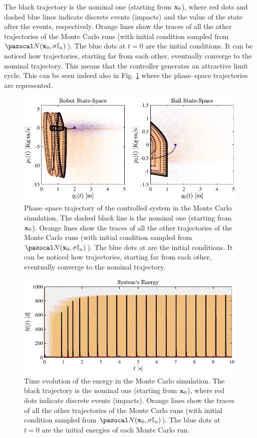 %
The black trajectory is the nominal one (starting from $\mathbf{x}_0$), where red dots and dashed blue lines indicate discrete events (impacts) and the value of the state after the events, respectively. Orange lines show the traces of all the other trajectories of the Monte Carlo runs (with initial condition sampled from $\N(\xb_0,\sigma\mathbb{I}_n)$). The blue dots at $t=0$ are the initial conditions. It can be noticed how trajectories, starting far from each other, eventually converge to the nominal trajectory. This means that the controller generates an attractive limit cycle. This can be seen indeed also in Fig. \ref{fig:reg2} where the phase--space trajectories are represented.
%
\begin{figure}[!ht]
    \centering
    \includegraphics[width = \linewidth]{Figures/reg2.pdf}
    \caption[Phase--space trajectory of the controlled system in the Monte Carlo simulation]{Phase--space trajectory of the controlled system in the Monte Carlo simulation. The dashed black line is the nominal one (starting from $\mathbf{x}_0$). Orange lines show the traces of all the other trajectories of the Monte Carlo runs (with initial condition sampled from $\N(\xb_0,\sigma\mathbb{I}_n)$). The blue dots at are the initial conditions. It can be noticed how trajectories, starting far from each other, eventually converge to the nominal trajectory.}
    \label{fig:reg2}
\end{figure}
%
\begin{figure}[!ht]
    \centering
    \includegraphics[width = \linewidth]{Figures/reg3.pdf}
    \caption[Time evolution of the energy in the Monte Carlo simulation]{Time evolution of the energy in the Monte Carlo simulation. The black trajectory is the nominal one (starting from $\mathbf{x}_0$), where red dots indicate discrete events (impacts). Orange lines show the traces of all the other trajectories of the Monte Carlo runs (with initial condition sampled from $\N(\xb_0,\sigma\mathbb{I}_n)$). The blue dots at $t=0$ are the initial energies of each Monte Carlo run.}
    \label{fig:reg3}
\end{figure}

